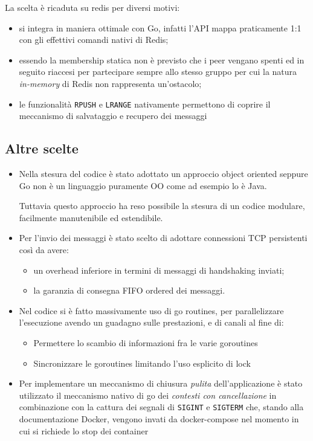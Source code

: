 \documentclass[conference]{IEEEtran}
\begin{document}
La scelta è ricaduta su redis per diversi motivi:
\begin{itemize}
\item si integra in maniera ottimale con Go, infatti l'API mappa praticamente 1:1 con gli effettivi comandi nativi di Redis;
\item essendo la membership statica non è previsto che i peer vengano spenti ed in seguito riaccesi per partecipare sempre allo stesso gruppo per cui la natura \textit{in-memory} di Redis non rappresenta un'ostacolo;
\item le funzionalità \texttt{RPUSH} e \texttt{LRANGE} nativamente permettono di coprire il meccanismo di salvataggio e recupero dei messaggi
\end{itemize}

\subsection{Altre scelte}
\begin{itemize}
\item Nella stesura del codice è stato adottato un approccio object oriented seppure Go non è un linguaggio puramente OO come ad esempio lo è Java.

Tuttavia questo approccio ha reso possibile la stesura di un codice modulare, facilmente manutenibile ed estendibile.

\item Per l'invio dei messaggi è stato scelto di adottare connessioni TCP persistenti così da avere:
\begin{itemize}
\item un overhead inferiore in termini di messaggi di handshaking inviati;
\item la garanzia di consegna FIFO ordered dei messaggi.
\end{itemize}

\item Nel codice si è fatto massivamente uso di go routines, per parallelizzare l'esecuzione avendo un guadagno sulle prestazioni, e di canali al fine di:
\begin{itemize}
\item Permettere lo scambio di informazioni fra le varie goroutines
\item Sincronizzare le goroutines limitando l'uso esplicito di lock
\end{itemize}

\item Per implementare un meccanismo di chiusura \textit{pulita} dell'applicazione è stato utilizzato il meccanismo nativo di go dei \textit{contesti con cancellazione} in combinazione con la cattura dei segnali di \texttt{SIGINT} e \texttt{SIGTERM} che, stando alla documentazione Docker, vengono invati da docker-compose nel momento in cui si richiede lo stop dei container
\end{itemize}
\end{document}
